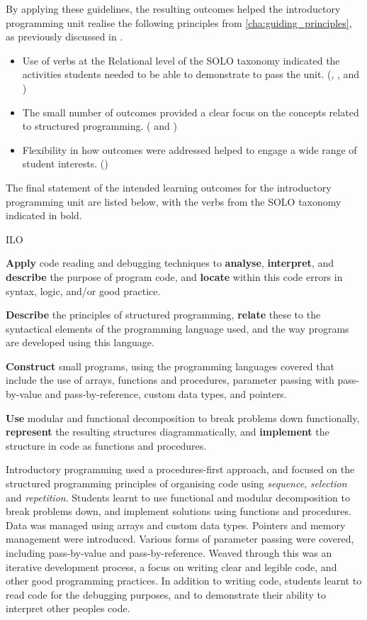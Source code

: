 By applying these guidelines, the resulting outcomes helped the introductory programming unit realise the following principles from \cref{cha:guiding_principles}, as previously discussed in .

\begin{itemize}[noitemsep,nolistsep]
	\item Use of verbs at the Relational level of the SOLO taxonomy indicated the activities students needed to be able to demonstrate to pass the unit. (, , and )
	\item The small number of outcomes provided a clear focus on the concepts related to structured programming. ( and )
	\item Flexibility in how outcomes were addressed helped to engage a wide range of student interests. ()
\end{itemize}

The final statement of the intended learning outcomes for the introductory programming unit are listed below, with the verbs from the SOLO taxonomy indicated in bold.

\begin{guidelines}{ILO}
	\item \textbf{Apply} code reading and debugging techniques to \textbf{analyse}, \textbf{interpret}, and \textbf{describe} the purpose of program code, and \textbf{locate} within this code errors in syntax, logic, and/or good practice.
	\item \textbf{Describe} the principles of structured programming, \textbf{relate} these to the syntactical elements of the programming language used, and the way programs are developed using this language.
	\item \textbf{Construct} small programs, using the programming languages covered that include the use of arrays, functions and procedures, parameter passing with pass-by-value and pass-by-reference, custom data types, and pointers.
	\item \textbf{Use} modular and functional decomposition to break problems down functionally, \textbf{represent} the resulting structures diagrammatically, and \textbf{implement} the structure in code as functions and procedures.
\end{guidelines}

Introductory programming used a procedures-first approach, and focused on the structured programming principles of organising code using \emph{sequence}, \emph{selection} and \emph{repetition}. Students learnt to use functional and modular decomposition to break problems down, and implement solutions using functions and procedures. Data was managed using arrays and custom data types. Pointers and memory management were introduced. Various forms of parameter passing were covered, including pass-by-value and pass-by-reference. Weaved through this was an iterative development process, a focus on writing clear and legible code, and other good programming practices. In addition to writing code, students learnt to read code for the debugging purposes, and to demonstrate their ability to interpret other peoples code.

